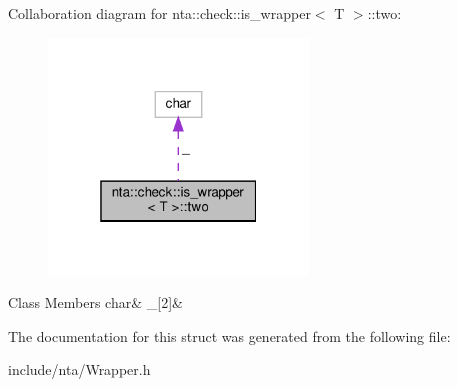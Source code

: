 Collaboration diagram for nta\+:\+:check\+:\+:is\+\_\+wrapper$<$ T $>$\+:\+:two\+:\nopagebreak
\begin{figure}[H]
\begin{center}
\leavevmode
\includegraphics[width=196pt]{d1/d80/structnta_1_1check_1_1is__wrapper_1_1two__coll__graph}
\end{center}
\end{figure}
\begin{DoxyFields}{Class Members}
\mbox{\label{structnta_1_1check_1_1is__wrapper_ac11466d0153a8e539984bd732c9dc9c9}} 
char&
\_\mbox{[}2\mbox{]}&
\\
\hline

\end{DoxyFields}


The documentation for this struct was generated from the following file\+:\begin{DoxyCompactItemize}
\item 
include/nta/Wrapper.\+h\end{DoxyCompactItemize}
